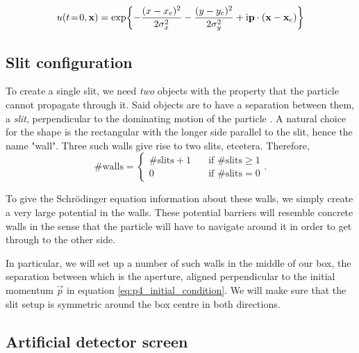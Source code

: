     \begin{equation}\label{eq:p4_initial_condition_scalarform}
        u(t\!=\!0, \mathbf{x}) = \exp{-\frac{(x-x_\mathrm{c})^2}{2\sigma_x^2} -\frac{(y-y_\mathrm{c})^2}{2\sigma_y^2} + \mathrm{i}\mathbf{p}\cdot (\mathbf{x}-\mathbf{x}_\mathrm{c})}
    \end{equation}


\subsection{Slit configuration}\label{sec:method:slit_config}
    To create a single slit, we need \textit{two} objects with the property that the particle cannot propagate through it. Said objects are to have a separation between them, a \textit{slit}, perpendicular to the dominating motion of the particle . A natural choice for the shape is the rectangular with the longer side parallel to the slit,  hence the name "wall". Three such walls give rise to two slits, etcetera. Therefore, 
    \begin{equation}
        \#\mathrm{walls} = \begin{cases}
            \#\mathrm{slits} + 1 \quad &\mathrm{if}\,\, \#\mathrm{slits} \geq 1 \\
            0 \quad                     &\mathrm{if}\,\, \#\mathrm{slits} =0 
        \end{cases}.
    \end{equation}

    To give the Schrödinger equation information about these walls, we simply create a very large potential in the walls. These potential barriers will resemble concrete  walls in the sense that the particle will have to navigate around it in order to get through to the other side.

    In particular, we will set up a number of such walls in the middle of our box, the separation between which is the aperture, aligned perpendicular to the initial momentum $\vec{p}$ in equation \eqref{eq:p4_initial_condition}. We will make sure that the slit setup is symmetric around the box centre in both directions.


\subsection{Artificial detector screen}\label{sec:method:screen}

